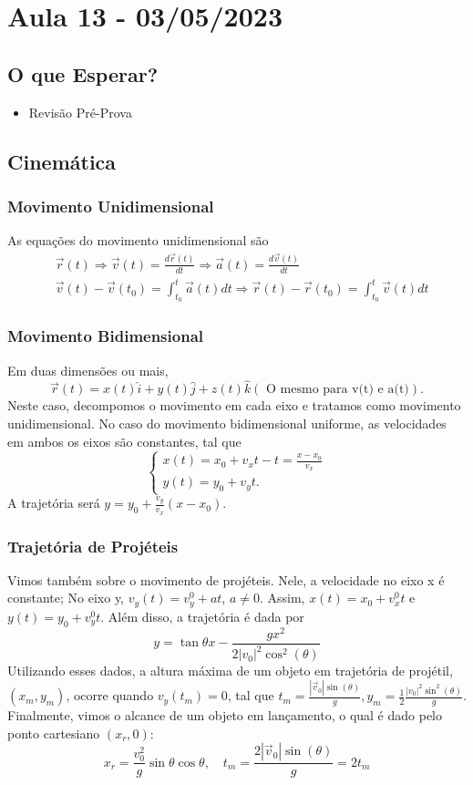 \documentclass[PhysicsI/physics_notes.tex]{subfiles}
\begin{document}
\section{Aula 13 - 03/05/2023}
\subsection{O que Esperar?}
\begin{itemize}
	\item Revisão Pré-Prova
\end{itemize}
\subsection{Cinemática}
\subsubsection{Movimento Unidimensional}
As equações do movimento unidimensional são
\begin{align*}
	 & \vec{r}(t)\Rightarrow \vec{v}(t)=\frac{d \vec{r}(t)}{dt} \Rightarrow \vec{a}(t) = \frac{d \vec{v}(t)}{dt}                         \\
	 & \vec{v}(t)-\vec{v}(t_{0}) = \int_{t_{0}}^{t} \vec{a}(t)dt \Rightarrow \vec{r}(t) - \vec{r}(t_{0}) = \int_{t_{0}}^{t} \vec{v}(t)dt
\end{align*}
\subsubsection{Movimento Bidimensional}
Em duas dimensões ou mais,
$$
	\vec{r}(t) = x(t)\hat{i} + y(t)\hat{j} + z(t)\hat{k} (\text{ O mesmo para v(t) e a(t)}).
$$
Neste caso, decompomos o movimento em cada eixo e tratamos como movimento unidimensional. No caso do movimento bidimensional uniforme,
as velocidades em ambos os eixos são constantes, tal que
$$
	\left\{\begin{array}{ll}
		x(t) = x_{0} + v_{x}t - t = \frac{x-x_{0}}{v_{x}} \\
		y(t) = y_{0} + v_{y}t.
	\end{array}\right.
$$
A trajetória será $y=y_{0} + \frac{v_{y}}{v_{x}}(x-x_{0}).$
\subsubsection{Trajetória de Projéteis}
Vimos também sobre o movimento de projéteis. Nele, a velocidade no eixo x é constante; No eixo y, $v_{y}(t) = v_{y}^{0} + at$,
$a\neq0$. Assim, $x(t) = x_{0} + v_{x}^{0}t$ e $y(t) = y_{0} + v_{y}^{0}t$. Além disso, a trajetória é dada por
$$
	y = \tan{\theta }x - \frac{gx^{2}}{2|v_{0}|^{2}\cos^{2}{(\theta )}}
$$
Utilizando esses dados, a altura máxima de um objeto em trajetória de projétil, $(x_{m}, y_{m})$, ocorre quando
$v_{y}(t_{m}) = 0$, tal que $t_{m}=\frac{|\vec{v}_{0}|\sin{(\theta )}}{g}, y_{m}=\frac{1}{2}\frac{|v_{0}|^{2}\sin^{2}{(\theta )}}{g}.$
Finalmente, vimos o alcance de um objeto em lançamento, o qual é dado pelo ponto cartesiano $(x_{r}, 0)$:
$$
	x_{r} = \frac{v_{0}^{2}}{g}\sin{\theta }\cos{\theta },\quad t_{m} = \frac{2|\vec{v}_{0}|\sin{(\theta)}}{g} = 2t_{m}
$$
\end{document}
